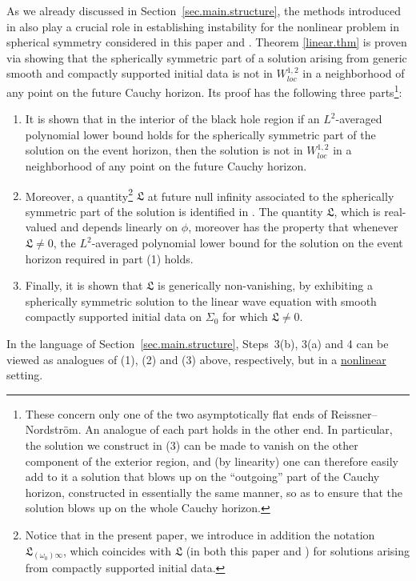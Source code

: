 \documentclass[10pt, reqno]{amsart}
\theoremstyle{definition}
\theoremstyle{remark}
\numberwithin{equation}{section}
\newcommand{\0}{\emptyset}
\newcommand{\Sgm}{\Sigma}
\newcommand{\omg}{\omega}
\begin{document}
As we already discussed in Section~\ref{sec.main.structure}, the methods introduced in \cite{LO.instab} also play a crucial role in establishing instability for the nonlinear problem in spherical symmetry considered in this paper and \cite{LO.exterior}. Theorem \ref{linear.thm} is proven via showing that the spherically symmetric part of a solution arising from generic smooth and compactly supported initial data is not in $W^{1,2}_{loc}$ in a neighborhood of any point on the future Cauchy horizon. Its proof has the following three parts\footnote{These concern only one of the two asymptotically flat ends of Reissner--Nordstr\"om. An analogue of each part holds in the other end. In particular, the solution we construct in (3) can be made to vanish on the other component of the exterior region, and (by linearity) one can therefore easily add to it a solution that blows up on the ``outgoing'' part of the Cauchy horizon, constructed in essentially the same manner, so as to ensure that the solution blows up on the whole Cauchy horizon.}:
\begin{enumerate}
\item It is shown that in the interior of the black hole region if an $L^2$-averaged polynomial lower bound holds for the spherically symmetric part of the solution on the event horizon, then the solution is not in $W^{1,2}_{loc}$ in a neighborhood of any point on the future Cauchy horizon.
\item Moreover, a quantity\footnote{Notice that in the present paper, we introduce in addition the notation $\mathfrak L_{(\omg_{0}) \infty}$, which coincides with $\mathfrak L$ (in both this paper and \cite{LO.instab}) for solutions arising from compactly supported initial data.} $\mathfrak L$ at future null infinity associated to the spherically symmetric part of the solution is identified in \cite{LO.instab}. The quantity $\mathfrak L$, which is real-valued and depends linearly on $\phi$, moreover has the property that whenever $\mathfrak L\neq 0$, the $L^2$-averaged polynomial lower bound for the solution on the event horizon required in part (1) holds.
\item Finally, it is shown that $\mathfrak L$ is generically non-vanishing, by exhibiting a spherically symmetric solution to the linear wave equation with smooth compactly supported initial data on $\Sgm_{0}$ for which $\mathfrak{L} \neq 0$.
\end{enumerate}
In the language of Section~\ref{sec.main.structure}, Steps~3(b), 3(a) and 4 can be viewed as analogues of (1), (2) and (3) above, respectively, but in a \underline{nonlinear} setting.
\end{document}

